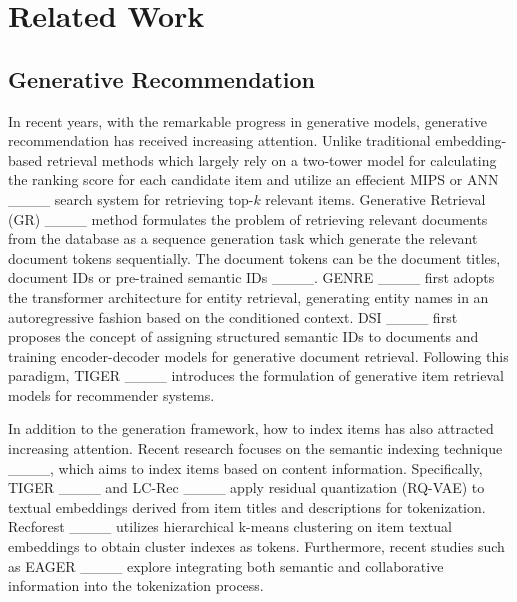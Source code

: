 \section{Related Work}
\subsection{Generative Recommendation}
In recent years, with the remarkable progress in generative models, generative recommendation has received increasing attention. Unlike traditional embedding-based retrieval methods which largely rely on a two-tower model for calculating the ranking score for each candidate item and utilize an effecient MIPS or ANN ____ search system for retrieving top-$k$ relevant items. Generative Retrieval (GR) ____ method formulates the problem of retrieving relevant documents from the database as a sequence generation task which generate the relevant document tokens sequentially. The document tokens can be the document titles, document IDs or pre-trained semantic IDs ____. GENRE ____ first adopts the transformer architecture for entity retrieval, generating entity names in an autoregressive fashion based on the conditioned context. DSI ____ first proposes the concept of assigning structured semantic IDs to documents and training encoder-decoder models for generative document retrieval. Following this paradigm, TIGER ____ introduces the formulation of generative item retrieval models for recommender systems. 

In addition to the generation framework, how to index items has also attracted increasing attention. Recent research focuses on the semantic indexing technique ____, which aims to index items based on content information. Specifically, TIGER ____ and LC-Rec ____ apply residual quantization (RQ-VAE) to textual embeddings derived from item titles and descriptions for tokenization. Recforest ____ utilizes hierarchical k-means clustering on item textual embeddings to obtain cluster indexes as tokens. Furthermore, recent studies such as EAGER ____ explore integrating both semantic and collaborative information into the tokenization process. 

